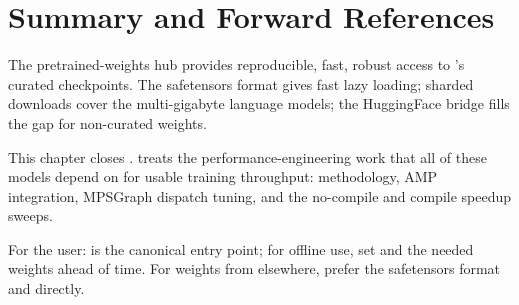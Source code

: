 \section{Summary and Forward References}
\label{sec:pretrained:summary}

The pretrained-weights hub provides reproducible, fast,
robust access to \Lucid's curated checkpoints. The safetensors
format gives fast lazy loading; sharded downloads cover the
multi-gigabyte language models; the HuggingFace bridge fills
the gap for non-curated weights.

This chapter closes .
 treats the performance-engineering
work that all of these models depend on for usable training
throughput: methodology, AMP integration, MPSGraph dispatch
tuning, and the no-compile and compile speedup sweeps.

\begin{lucidnote}
For the user:  is the canonical entry
point; for offline use, set  and
 the needed weights ahead of time.
For weights from elsewhere, prefer the safetensors format and
 directly.
\end{lucidnote}
